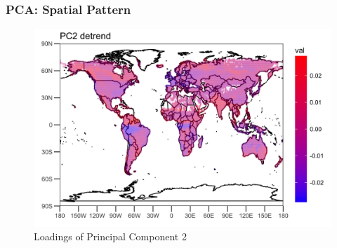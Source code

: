 \documentclass{beamer}
\begin{document}
\begin{frame}
\frametitle{PCA: Spatial Pattern}
\begin{figure}
\centering
\includegraphics[width=0.9\linewidth]{../img/loading_PC2_de}
\caption{Loadings of Principal Component 2}
\label{fig:loadingpc2}
\end{figure}
\end{frame}
\end{document}
